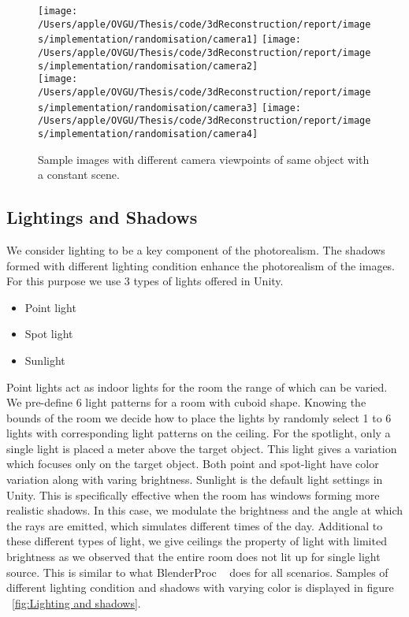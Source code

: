 \begin{figure}
    \centering
    \texttt{[image: /Users/apple/OVGU/Thesis/code/3dReconstruction/report/images/implementation/randomisation/camera1]}
    \texttt{[image: /Users/apple/OVGU/Thesis/code/3dReconstruction/report/images/implementation/randomisation/camera2]}\\
    \vspace{0.1cm}
    \texttt{[image: /Users/apple/OVGU/Thesis/code/3dReconstruction/report/images/implementation/randomisation/camera3]}
    \texttt{[image: /Users/apple/OVGU/Thesis/code/3dReconstruction/report/images/implementation/randomisation/camera4]}\\
    \caption{Sample images with different camera viewpoints of same object with a constant scene.}
    \label{fig:Camera viewpoints}
\end{figure}

\subsection{Lightings and Shadows}

We consider lighting to be a key component of the photorealism.
The shadows formed with different lighting condition enhance the photorealism of the images.
For this purpose we use 3 types of lights offered in Unity.

\begin{itemize}
    \item Point light
    \item Spot light
    \item Sunlight
\end{itemize}

Point lights act as indoor lights for the room the range of which can be varied.
We pre-define 6 light patterns for a room with cuboid shape.
Knowing the bounds of the room we decide how to place the lights by randomly select 1 to 6 lights with corresponding light patterns on the ceiling.
For the spotlight, only a single light is placed a meter above the target object.
This light gives a variation which focuses only on the target object.
Both point and spot-light have color variation along with varing brightness.
Sunlight is the default light settings in Unity.
This is specifically effective when the room has windows forming more realistic shadows.
In this case, we modulate the brightness and the angle at which the rays are emitted, which simulates different times of the day.
Additional to these different types of light, we give ceilings the property of light with limited brightness as we observed that the entire room does not lit up for single light source.
This is similar to what BlenderProc ~\cite{denninger2019blenderproc} does for all scenarios.
Samples of different lighting condition and shadows with varying color is displayed in figure ~\ref{fig:Lighting and shadows}.

